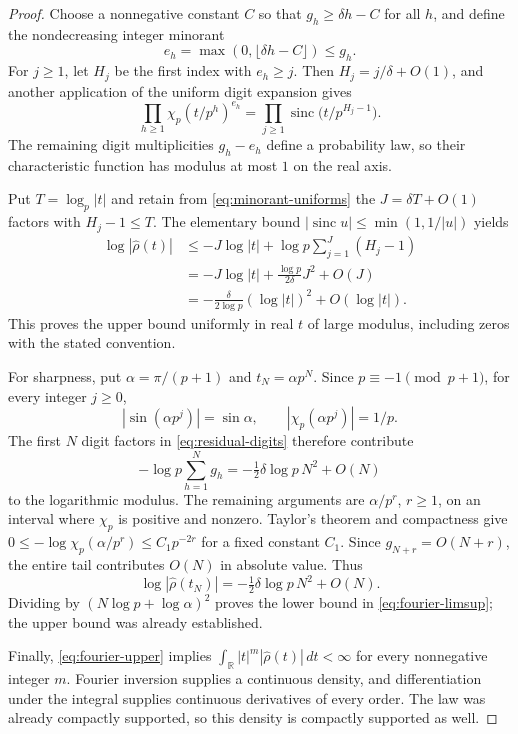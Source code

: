 \documentclass[11pt,a4paper]{article}
\theoremstyle{remark}
\newcommand{\R}{\mathbb R}
\newcommand{\sinc}{\operatorname{sinc}}
\newcommand{\cf}[1]{\widehat{#1}}
\begin{document}
\begin{proof}
Choose a nonnegative constant $C$ so that $g_h\ge\delta h-C$ for all $h$,
and define the nondecreasing integer minorant
\[
 e_h=\max(0,\lfloor\delta h-C\rfloor)\le g_h.
\]
For $j\ge1$, let $H_j$ be the first index with $e_h\ge j$. Then
$H_j=j/\delta+O(1)$, and another application of the uniform digit expansion
gives
\begin{equation}
 \prod_{h\ge1}\chi_p(t/p^h)^{e_h}
   =\prod_{j\ge1}\sinc\bigl(t/p^{H_j-1}\bigr).
 \label{eq:minorant-uniforms}
\end{equation}
The remaining digit multiplicities $g_h-e_h$ define a probability law, so their
characteristic function has modulus at most $1$ on the real axis.

Put $T=\log_p|t|$ and retain from \eqref{eq:minorant-uniforms} the
$J=\delta T+O(1)$ factors with $H_j-1\le T$. The elementary bound
$|\sinc u|\le\min(1,1/|u|)$ yields
\begin{align*}
 \log|\cf\rho(t)|
 &\le -J\log|t|+\log p\sum_{j=1}^{J}(H_j-1)\\
 &=-J\log|t|+\frac{\log p}{2\delta}J^2+O(J)\\
 &=-\frac{\delta}{2\log p}(\log|t|)^2+O(\log|t|).
\end{align*}
This proves the upper bound uniformly in real $t$ of large modulus, including
zeros with the stated convention.

For sharpness, put $\alpha=\pi/(p+1)$ and $t_N=\alpha p^N$. Since
$p\equiv-1\pmod{p+1}$, for every integer $j\ge0$,
\[
 |\sin(\alpha p^j)|=\sin\alpha,
 \qquad |\chi_p(\alpha p^j)|=1/p.
\]
The first $N$ digit factors in \eqref{eq:residual-digits} therefore contribute
\[
 -\log p\sum_{h=1}^{N}g_h
 =-\tfrac12\delta\log p\,N^2+O(N)
\]
to the logarithmic modulus. The remaining arguments are
$\alpha/p^r$, $r\ge1$, on an interval where $\chi_p$ is positive and nonzero.
Taylor's theorem and compactness give
$0\le-\log\chi_p(\alpha/p^r)\le C_1p^{-2r}$ for a fixed constant $C_1$.
Since $g_{N+r}=O(N+r)$, the entire tail contributes $O(N)$ in absolute value.
Thus
\[
 \log|\cf\rho(t_N)|=-\tfrac12\delta\log p\,N^2+O(N).
\]
Dividing by $(N\log p+\log\alpha)^2$ proves the lower bound in
\eqref{eq:fourier-limsup}; the upper bound was already established.

Finally, \eqref{eq:fourier-upper} implies
$\int_\R |t|^m|\cf\rho(t)|\,dt<\infty$ for every nonnegative integer $m$.
Fourier inversion supplies a continuous density, and differentiation under the
integral supplies continuous derivatives of every order. The law was already
compactly supported, so this density is compactly supported as well.
\end{proof}
\end{document}
